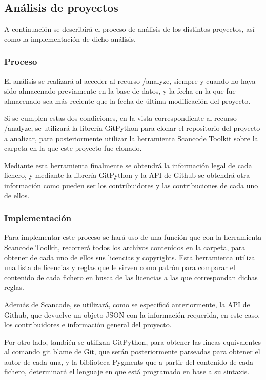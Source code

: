 \documentclass[a4paper, spanish, 12pt]{book}
\begin{document}
\subsection{An\'alisis de proyectos}
\label{subsec:analysis}

A continuaci\'on se describir\'a el proceso de an\'alisis de los distintos proyectos,
as\'i como la implementaci\'on de dicho an\'alisis.

\subsubsection*{Proceso}
\label{subsubsec:proceso}

El an\'alisis se realizar\'a al acceder al recurso /analyze,
siempre y cuando no haya sido almacenado previamente en la base de datos, y la
fecha en la que fue almacenado sea m\'as reciente que la fecha de \'ultima
modificaci\'on del proyecto.

Si se cumplen estas dos condiciones, en la vista correspondiente al recurso /analyze,
se utilizar\'a la librer\'ia GitPython para clonar el repositorio del proyecto
a analizar, para posteriormente utilizar la herramienta Scancode Toolkit sobre la
carpeta en la que este proyecto fue clonado.

Mediante esta herramienta finalmente se obtendr\'a la informaci\'on legal de cada
fichero, y mediante la librer\'ia GitPython y la API de Github se obtendr\'a otra informaci\'on como
pueden ser los contribuidores y las contribuciones de cada uno de ellos.

\subsubsection*{Implementaci\'on}
\label{subsubsec:implementacion}

Para implementar este proceso se har\'a uso de una funci\'on que con la herramienta
Scancode Toolkit, recorrer\'a todos los archivos contenidos en la carpeta, para
obtener de cada uno de ellos sus licencias y copyrights. Esta herramienta utiliza
una lista de licencias y reglas que le sirven como patr\'on para comparar el
contenido de cada fichero en busca de las licencias a las que correspondan dichas reglas.

Adem\'as de Scancode, se utilizar\'a, como se especific\'o anteriormente, la API de
Github, que devuelve un objeto JSON con la informaci\'on requerida, en este caso,
los contribuidores e informaci\'on general del proyecto.

Por otro lado, tambi\'en se utilizan GitPython, para obtener las lineas equivalentes al comando git blame de Git,
que ser\'an posteriormente parseadas para obtener el autor de cada una, y la biblioteca
Pygments que a partir del contenido de cada fichero, determinar\'a el lenguaje en
que est\'a programado en base a su sintaxis.
\end{document}
